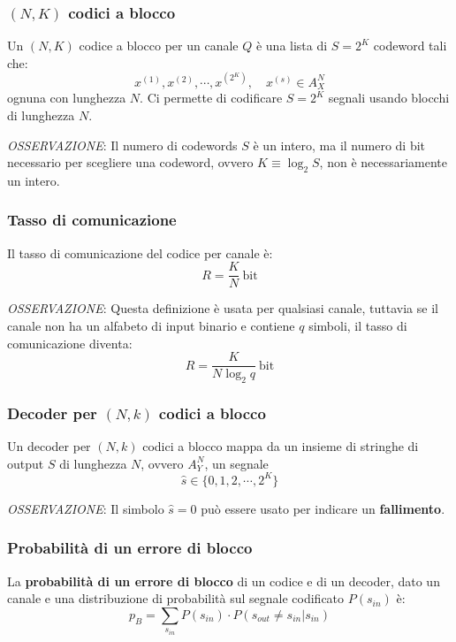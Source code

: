 \subsubsection{$(N,K)$ codici a blocco}
Un $(N,K)$ codice a blocco per un canale $Q$ è una lista di $S=2^K$ codeword tali che:
\begin{equation}
	{x^{(1)}, x^{(2)}, \cdots, x^{(2^K)}}, \quad x^{(s)}\in A_X^N
\end{equation}
ognuna con lunghezza $N$. Ci permette di codificare $S = 2^K$ segnali usando blocchi di lunghezza $N$.

\textit{OSSERVAZIONE}: Il numero di codewords $S$ è un intero, ma il numero di bit necessario per scegliere una codeword, ovvero $K\equiv \log_2 S$, non è necessariamente un intero.

\newpage
\subsubsection{Tasso di comunicazione}
Il tasso di comunicazione del codice per canale è:
\begin{equation}
	R = \frac{K}{N}\ \text{bit}
\end{equation}

\textit{OSSERVAZIONE}: Questa definizione è usata per qualsiasi canale, tuttavia se il canale non ha un alfabeto di input binario e contiene $q$ simboli, il tasso di comunicazione diventa:
\begin{equation}
	R = \frac{K}{N \log_{2} q}\ \text{bit} 
\end{equation}

\subsubsection{Decoder per $(N,k)$ codici a blocco}
Un decoder per $(N,k)$ codici a blocco mappa da un insieme di stringhe di output $S$ di lunghezza $N$, ovvero $A_Y^N$, un segnale $$\hat{s} \in \{0,1,2,\cdots,2^K\}$$

\textit{OSSERVAZIONE}: Il simbolo $\hat{s} = 0$ può essere usato per indicare un \textbf{fallimento}.

\subsubsection{Probabilità di un errore di blocco}
La \textbf{probabilità di un errore di blocco} di un codice e di un decoder, dato un canale e una distribuzione di probabilità sul segnale codificato $P(s_{in})$ è:
\begin{equation}
	p_B = \sum_{s_{in}} P(s_{in})\cdot P(s_{out} \neq s_{in}|s_{in})
\end{equation}

